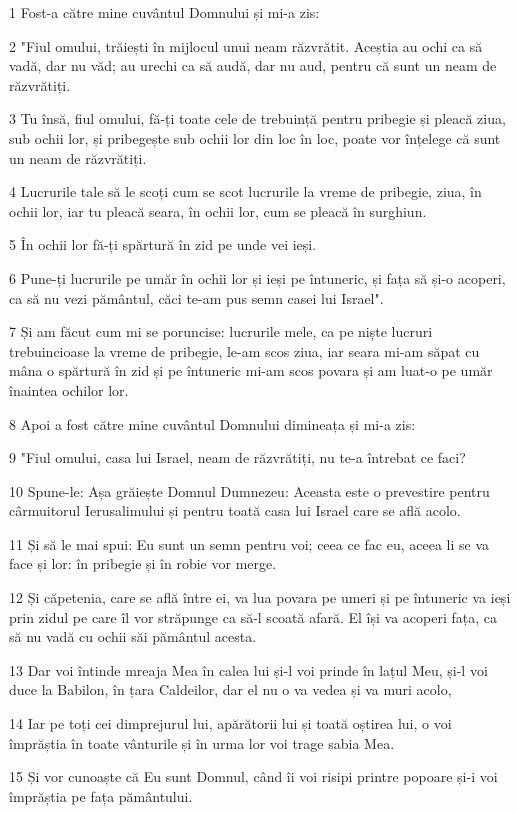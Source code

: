 \par 1 Fost-a către mine cuvântul Domnului și mi-a zis:
\par 2 "Fiul omului, trăiești în mijlocul unui neam răzvrătit. Aceștia au ochi ca să vadă, dar nu văd; au urechi ca să audă, dar nu aud, pentru că sunt un neam de răzvrătiți.
\par 3 Tu însă, fiul omului, fă-ți toate cele de trebuință pentru pribegie și pleacă ziua, sub ochii lor, și pribegește sub ochii lor din loc în loc, poate vor înțelege că sunt un neam de răzvrătiți.
\par 4 Lucrurile tale să le scoți cum se scot lucrurile la vreme de pribegie, ziua, în ochii lor, iar tu pleacă seara, în ochii lor, cum se pleacă în surghiun.
\par 5 În ochii lor fă-ți spărtură în zid pe unde vei ieși.
\par 6 Pune-ți lucrurile pe umăr în ochii lor și ieși pe întuneric, și fața să și-o acoperi, ca să nu vezi pământul, căci te-am pus semn casei lui Israel".
\par 7 Și am făcut cum mi se poruncise: lucrurile mele, ca pe niște lucruri trebuincioase la vreme de pribegie, le-am scos ziua, iar seara mi-am săpat cu mâna o spărtură în zid și pe întuneric mi-am scos povara și am luat-o pe umăr înaintea ochilor lor.
\par 8 Apoi a fost către mine cuvântul Domnului dimineața și mi-a zis:
\par 9 "Fiul omului, casa lui Israel, neam de răzvrătiți, nu te-a întrebat ce faci?
\par 10 Spune-le: Așa grăiește Domnul Dumnezeu: Aceasta este o prevestire pentru cârmuitorul Ierusalimului și pentru toată casa lui Israel care se află acolo.
\par 11 Și să le mai spui: Eu sunt un semn pentru voi; ceea ce fac eu, aceea li se va face și lor: în pribegie și în robie vor merge.
\par 12 Și căpetenia, care se află între ei, va lua povara pe umeri și pe întuneric va ieși prin zidul pe care îl vor străpunge ca să-l scoată afară. El își va acoperi fața, ca să nu vadă cu ochii săi pământul acesta.
\par 13 Dar voi întinde mreaja Mea în calea lui și-l voi prinde în lațul Meu, și-l voi duce la Babilon, în țara Caldeilor, dar el nu o va vedea și va muri acolo,
\par 14 Iar pe toți cei dimprejurul lui, apărătorii lui și toată oștirea lui, o voi împrăștia în toate vânturile și în urma lor voi trage sabia Mea.
\par 15 Și vor cunoaște că Eu sunt Domnul, când îi voi risipi printre popoare și-i voi împrăștia pe fața pământului.
